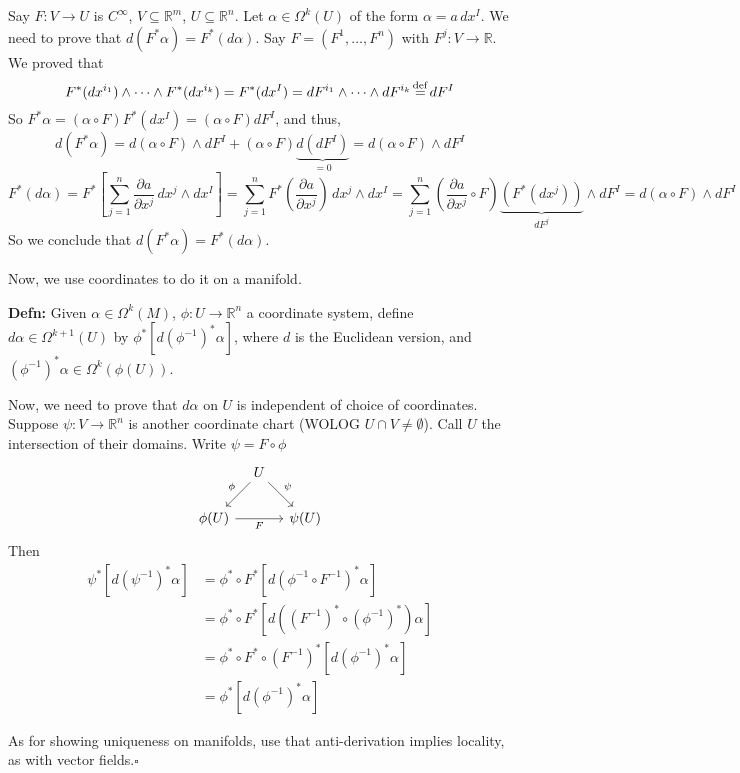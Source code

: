 \documentclass[10pt,letterpaper]{article}
\newcommand{\n}{\hfill\break}
\newcommand{\hangblock}[2]{\par\noindent\settowidth{\hangindent}{\textbf{#1: }}\textbf{#1: }\nolinebreak#2}
\newcommand{\defn}[1]{\hangblock{Defn}{#1}}
\newcommand{\proven}{\;$\square$\n}
\newcommand{\ptxt}[1]{\textrm{\textnormal{#1}}}
\newcommand{\reals}{\mathbb{R}}
\newcommand{\R}{\reals}
\newcommand{\inv}{^{-1}}
\newcommand{\of}{\circ}
\newcommand{\pd}[2]{\frac{\partial{}#1}{\partial{}#2}}
\newcommand{\labeledeq}[1]{\overset{\mathclap{\ptxt{#1}}}{=}}
\newcommand{\eqdef}{\labeledeq{def}}
\newcommand{\paren}[1]{\left(#1\right)}
\renewcommand{\brack}[1]{\left[#1\right]}
\let\b\relax
\newcommand{\b}[1]{\textbf{#1}}
\begin{document}
\par\noindent
\b{Naturality:} Say $F:V\to{}U$ is $C^{\infty}$, $V\subseteq\R^{m}$, $U\subseteq\R^{n}$. Let $\alpha\in\Omega^{k}(U)$ of the form $\alpha=a\,dx^{I}$. We need to prove that $d(F^{*}\alpha)=F^{*}(d\alpha)$. Say $F=(F^{1},\ldots,F^{n})$ with $F^{j}:V\to\R$. We proved that
\[
	F^{*}(dx^{i_{1}})\wedge\cdots\wedge{}F^{*}(dx^{i_{k}})=F^{*}(dx^{I})=dF^{i_{1}}\wedge\cdots\wedge{}dF^{i_{k}}\eqdef{}dF^{I}
\]
So $F^{*}\alpha=(\alpha\of{}F)F^{*}(dx^{I})=(\alpha\of{}F)dF^{I}$, and thus,
\[
	d(F^{*}\alpha)=d(\alpha\of{}F)\wedge{}dF^{I}+(\alpha\of{}F)\underbrace{d(dF^{I})}_{=0}=d(\alpha\of{}F)\wedge{}dF^{I}
\]
\[
	F^{*}(d\alpha)=F^{*}\brack{\sum_{j=1}^{n}\pd{a}{x^{j}}\,dx^{j}\wedge{}dx^{I}}=\sum_{j=1}^{n}F^{*}\paren{\pd{a}{x^{j}}}\,dx^{j}\wedge{}dx^{I}=\sum_{j=1}^{n}\paren{\pd{a}{x^{j}}\of{}F}\underbrace{\paren{F^{*}(dx^{j})}}_{dF^{j}}\wedge{}dF^{I}=d(\alpha\of{}F)\wedge{}dF^{I}
\]
So we conclude that $d(F^{*}\alpha)=F^{*}(d\alpha)$.\n

\par\noindent
Now, we use coordinates to do it on a manifold.\n

\defn{
	Given $\alpha\in\Omega^{k}(M)$, $\phi:U\to\R^{n}$ a coordinate system, define $d\alpha\in\Omega^{k+1}(U)$ by $\phi^{*}\brack{d(\phi\inv)^{*}\alpha}$, where $d$ is the Euclidean version, and $(\phi\inv)^{*}\alpha\in\Omega^{k}(\phi(U))$.\n
}

\par\noindent
Now, we need to prove that $d\alpha$ on $U$ is independent of choice of coordinates. Suppose $\psi:V\to\R^{n}$ is another coordinate chart (WOLOG $U\cap{}V\ne\emptyset$). Call $U$ the intersection of their domains. Write $\psi=F\of\phi$
\[
	\begin{tikzcd}
		&[-15pt] U \arrow[dl, "\phi", swap] \arrow[dr, "\psi"] &[-15pt]\\
		\phi(U) \arrow[rr, "F", swap] & & \psi(U)
	\end{tikzcd}
\]
Then
\begin{align*}
	\psi^{*}\brack{d(\psi\inv)^{*}\alpha} & =\phi^{*}\of{}F^{*}\brack{d(\phi\inv\of{}F\inv)^{*}\alpha}\\
	& =\phi^{*}\of{}F^{*}\brack{d((F\inv)^{*}\of(\phi\inv)^{*})\alpha}\\
	& =\phi^{*}\of{}F^{*}\of(F\inv)^{*}\brack{d(\phi\inv)^{*}\alpha}\\
	& =\phi^{*}\brack{d(\phi\inv)^{*}\alpha}
\end{align*}
\n

\par\noindent
As for showing uniqueness on manifolds, use that anti-derivation implies locality, as with vector fields.\proven
\end{document}
